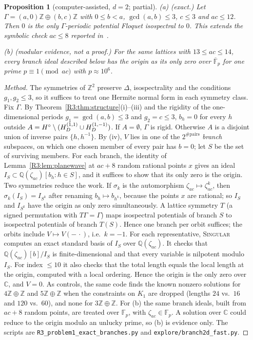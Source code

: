 \documentclass[11pt]{amsart}
\newtheorem{proposition}[theorem]{Proposition}
\theoremstyle{definition}
\theoremstyle{remark}
\providecommand{\C}{\mathbb C}
\providecommand{\Q}{\mathbb Q}
\providecommand{\Z}{\mathbb Z}
\begin{document}
\begin{proposition}[computer-assisted, $d=2$; partial]\label{R3:prop:computations}
\textup{(a) (exact.)} Let $\Gamma=(a,0)\Z\oplus(b,c)\Z$ with $0\le b<a$,
$\gcd(a,b)\le3$, $c\le3$ and $ac\le12$. Then $0$ is the only $\Gamma$-periodic
potential Floquet isospectral to $0$. This extends the symbolic check $ac\le8$
reported in~\cite{R3-FFORS}.

\textup{(b) (modular evidence, not a proof.)} For the same lattices with
$13\le ac\le14$, every branch ideal described below has the origin as its only zero
over $\overline{\mathbb F}_p$ for one prime $p\equiv1\pmod{ac}$ with
$p\approx10^6$.
\end{proposition}

\begin{proof}[Method]
The symmetries of $\Z^2$ preserve $\Delta$, isospectrality and the conditions
$g_1,g_2\le3$, so it suffices to treat one Hermite normal form in each symmetry
class. Fix $\Gamma$. By Theorem~\ref{R3:thm:structure}(i)--(iii) and the rigidity
of the one-dimensional periods $g_1=\gcd(a,b)\le3$ and $g_2=c\le3$, $b_h=0$
for every $h$ outside $A=H^{\circ}\setminus(H_{D}^{(1,1)}\cup H_{D}^{(1,-1)})$.
If $A=\emptyset$, $\Gamma$ is rigid. Otherwise $A$ is a disjoint union of
inverse pairs $\{h,h^{-1}\}$. By (iv), $V$ lies in one of the
$2^{\#\text{pairs}}$ \emph{branch} subspaces, on which one chosen member of every
pair has $b=0$; let $S$ be the set of surviving members. For each branch, the
identity of Lemma~\ref{R3:lem:planewave} at $ac+8$ random rational points $x$ gives an
ideal $I_S\subset\Q(\zeta_{ac})[b_h:h\in S]$, and it suffices to show that its
only zero is the origin. Two symmetries reduce the work. If $\sigma_k$ is the
automorphism $\zeta_{ac}\mapsto\zeta_{ac}^k$, then $\sigma_k(I_S)=I_{S^k}$ after
renaming $b_h\mapsto b_{h^k}$, because the points $x$ are rational; so $I_S$ and
$I_{S^k}$ have the origin as only zero simultaneously. A lattice symmetry $T$ (a
signed permutation with $T\Gamma=\Gamma$) maps isospectral potentials of branch
$S$ to isospectral potentials of branch $T(S)$. Hence one branch per orbit
suffices; the orbits include $V\mapsto V(-\,\cdot)$, i.e.\ $k=-1$. For each
representative, \textsc{Singular}~\cite{R3-Singular} computes an exact standard
basis of $I_S$ over $\Q(\zeta_{ac})$. It checks that $\Q(\zeta_{ac})[b]/I_S$ is
finite-dimensional and that every variable is nilpotent modulo $I_S$. For index
$\le10$ it also checks that the total length equals the local length at the
origin, computed with a local ordering. Hence the origin is the only zero over $\C$,
and $V=0$. As
controls, the same code finds the known nonzero solutions for $4\Z\oplus\Z$ and
$5\Z\oplus\Z$ when the constraints on $K_1$ are dropped (lengths $24$ vs.\ $16$
and $120$ vs.\ $60$), and none for $3\Z\oplus\Z$. For (b) the same branch ideals,
built from $ac+8$ random points, are treated over $\mathbb F_p$, with
$\zeta_{ac}\in\mathbb F_p$. A solution over $\C$ could reduce to the origin
modulo an unlucky prime, so (b) is evidence only. The scripts are
\texttt{R3\_\allowbreak{}problem1\_\allowbreak{}exact\_\allowbreak{}branches.py} and \texttt{explore/branch2d\_\allowbreak{}fast.py}.
\end{proof}
\end{document}
